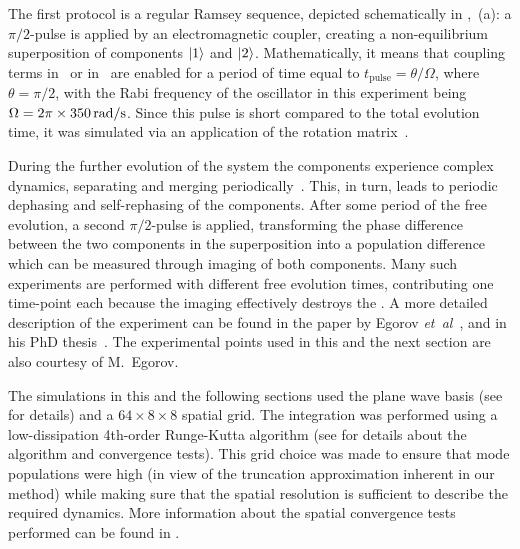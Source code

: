 The first protocol is a regular Ramsey sequence, depicted schematically in ,~(a): a $\pi/2$-pulse is applied by an electromagnetic coupler, creating a non-equilibrium superposition of components $\mbox{\ensuremath{\left\vert 1 \right\rangle}}$ and $\mbox{\ensuremath{\left\vert 2 \right\rangle}}$.
Mathematically, it means that coupling terms in~ or in~ are enabled for a period of time equal to $t_{\mathrm{pulse}} = \theta / \Omega$, where $\theta = \pi/2$, with the Rabi frequency of the oscillator in this experiment being $\Omega = 2\pi \times 350\mbox{\ensuremath{\,\mathrm{rad/s}}}$.
Since this pulse is short compared to the total evolution time, it was simulated via an application of the rotation matrix~.

During the further evolution of the system the components experience complex dynamics, separating and merging periodically~\cite{Mertes2007}.
This, in turn, leads to periodic dephasing and self-rephasing of the  components.
After some period of the free evolution, a second $\pi/2$-pulse is applied, transforming the phase difference between the two components in the superposition into a population difference which can be measured through imaging of both  components.
Many such experiments are performed with different free evolution times, contributing one time-point each because the imaging effectively destroys the .
A more detailed description of the experiment can be found in the paper by Egorov \textit{et~al}~\cite{Egorov2011}, and in his PhD thesis~\cite{Egorov2012}.
The experimental points used in this and the next section are also courtesy of M.~Egorov.

The simulations in this and the following sections used the plane wave basis (see  for details) and a $64\times8\times8$ spatial grid.
The integration was performed using a low-dissipation 4th-order Runge-Kutta algorithm (see  for details about the algorithm and convergence tests).
This grid choice was made to ensure that mode populations were high (in view of the truncation approximation inherent in our method) while making sure that the spatial resolution is sufficient to describe the required dynamics.
More information about the spatial convergence tests performed can be found in .

